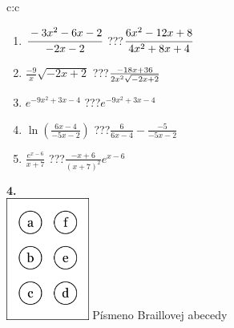 \documentclass[10pt]{report}
\begin{document}
\begin{tabular}{c:c}
\begin{minipage}[c][104.5mm][t]{0.5\linewidth}
\begin{center}
\begin{minipage}{0.79\linewidth}
\begin{center}
\begin{varwidth}{\linewidth}
\begin{enumerate}
\item $\cfrac{-3x^2-6x-2}{-2x-2}$\quad \dotfill\; ???\;\dotfill \quad $\cfrac{6x^2-12x+8}{4x^2+8x+4}$
\item $\frac{-9}{x}\sqrt{-2x+2}$\quad \dotfill\; ???\;\dotfill \quad $\frac{-18x+36}{2x^2 \sqrt{\smash[b]{-2x+2}}}$
\item $e^{-9x^2+3x-4}$\quad \dotfill\; ???\;\dotfill \quad $e^{-9x^2+3x-4}$
\item $\ln{\left(\frac{6x-4}{-5x-2}\right)}$\quad \dotfill\; ???\;\dotfill \quad $\frac{6}{6x-4}-\frac{-5}{-5x-2}$
\item $\frac{e^{x-6}}{x+7}$\quad \dotfill\; ???\;\dotfill \quad $\frac{-x+6}{(x+7)^2}e^{x-6}$
\end{enumerate}
\end{varwidth}
\end{center}
\end{minipage}
\begin{minipage}{0.20\linewidth}
\begin{center}
{\Huge\bfseries 4.} \\[2mm]
\includegraphics[height=40mm]{../images/braille.png}
{\small Písmeno Braillovej abecedy}
\end{center}
\end{minipage}
\end{center}
\end{minipage}
%
\end{tabular}
\newpage
\thispagestyle{empty}
\end{document}
